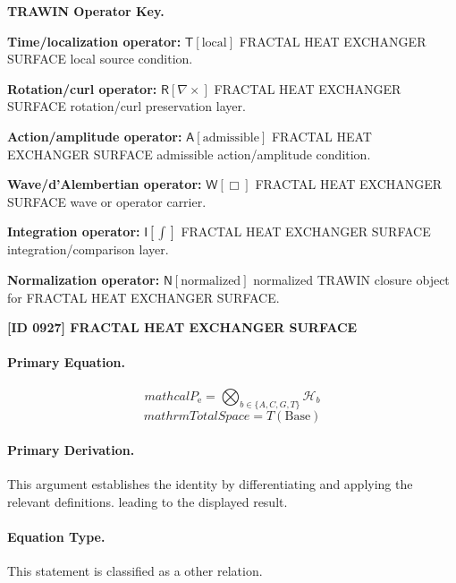 \par\vspace{0.45\baselineskip}
\noindent\begin{minipage}[t]{\linewidth}
\begingroup
\small
\raggedright
\textbf{TRAWIN Operator Key.}\par
\noindent\textbf{Time/localization operator:} $\mathsf{T}\!\left[\mathrm{local}\right]$ FRACTAL HEAT EXCHANGER SURFACE local source condition.\par
\noindent\textbf{Rotation/curl operator:} $\mathsf{R}\!\left[\nabla\times\right]$ FRACTAL HEAT EXCHANGER SURFACE rotation/curl preservation layer.\par
\noindent\textbf{Action/amplitude operator:} $\mathsf{A}\!\left[\mathrm{admissible}\right]$ FRACTAL HEAT EXCHANGER SURFACE admissible action/amplitude condition.\par
\noindent\textbf{Wave/d'Alembertian operator:} $\mathsf{W}\!\left[\Box\right]$ FRACTAL HEAT EXCHANGER SURFACE wave or operator carrier.\par
\noindent\textbf{Integration operator:} $\mathsf{I}\!\left[\int\right]$ FRACTAL HEAT EXCHANGER SURFACE integration/comparison layer.\par
\noindent\textbf{Normalization operator:} $\mathsf{N}\!\left[\mathrm{normalized}\right]$ normalized TRAWIN closure object for FRACTAL HEAT EXCHANGER SURFACE.\par
\endgroup
\end{minipage}

\clearpage
\noindent\textbf{[ID 0927] FRACTAL HEAT EXCHANGER SURFACE}\par
\vspace{0.35em}
\paragraph{Primary Equation.}
\[
mathcal{P}_{\mathrm{e}}=\bigotimes_{b\in\{A,C,G,T\}}\mathcal{H}_b
\]
\[
mathrm{TotalSpace}=T(\mathrm{Base})
\]

\paragraph{Primary Derivation.}
This argument establishes the identity by differentiating and applying the relevant definitions. leading to the displayed result.
\paragraph{Equation Type.}
This statement is classified as a other relation.

